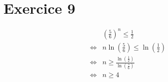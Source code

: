 \part{Exercice 9}

\begin{align*}
	&\left( \frac{5}{6} \right)^n \le \frac{1}{2}\\
	\iff& n \ln\left( \frac{5}{6} \right) \le \ln(\frac{1}{2})\\
	\iff& n \ge \frac{\ln\left( \frac{1}{2} \right)}{\ln\left( \frac{5}{6} \right)}\\
	\iff& n \ge 4
\end{align*}

